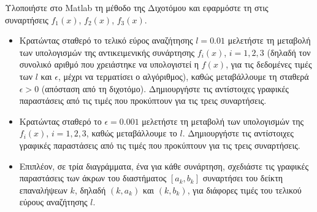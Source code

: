 Υλοποιήστε στο Matlab  τη μέθοδο της Διχοτόμου και εφαρμόστε τη στις 
συναρτήσεις $f_1(x)$, $f_2(x)$, $f_3(x)$.
\begin{itemize}
    \item Κρατώντας σταθερό το τελικό εύρος αναζήτησης $l = 0.01$ μελετήστε τη μεταβολή των
υπολογισμών της αντικειμενικής συνάρτησης $f_i(x)$, $i = 1,2,3$ (δηλαδή τον συνολικό αριθμό που
χρειάστηκε να υπολογιστεί η $f(x)$, για τις δεδομένες τιμές των $l$ και $\epsilon$, μέχρι να τερματίσει ο
αλγόριθμος), καθώς μεταβάλλουμε τη σταθερά $\epsilon > 0$ (απόσταση από τη διχοτόμο).
Δημιουργήστε τις αντίστοιχες γραφικές παραστάσεις από τις τιμές που προκύπτουν για τις τρεις
συναρτήσεις.
    \item Κρατώντας σταθερό το $\epsilon = 0.001$ μελετήστε τη μεταβολή των υπολογισμών της $f_i(x)$, 
$i=1,2,3$, καθώς μεταβάλλουμε το $l$. Δημιουργήστε τις αντίστοιχες γραφικές παραστάσεις από τις
τιμές που προκύπτουν για τις τρεις συναρτήσεις.
    \item Επιπλέον, σε τρία διαγράμματα, ένα για κάθε συνάρτηση, σχεδιάστε τις γραφικές παραστάσεις
των άκρων του διαστήματος $[a_k, b_k]$ συναρτήσει του δείκτη επαναλήψεων $k$, δηλαδή $(k, a_k)$ και
$(k, b_k)$, για διάφορες τιμές του τελικού εύρους αναζήτησης $l$.
\end{itemize}